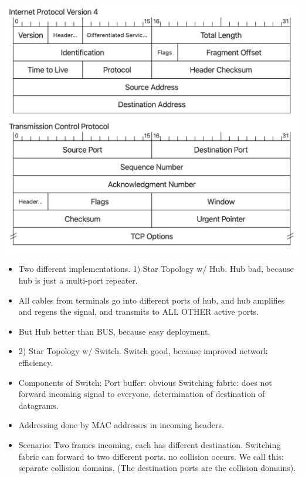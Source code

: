 \documentclass[10pt, landscape, oneside]{article}
\begin{document}
\begin{multicols}{6}
\includegraphics[width=\linewidth]{subfiles/Header_compact.png}


\begin{itemize}
    \item Two different implementations. 1) Star Topology w/ Hub. Hub bad, because hub is just a multi-port repeater.
    \item All cables from terminals go into different ports of hub, and hub amplifies and regens the signal, and transmits to ALL OTHER active ports.
    \item But Hub better than BUS, because easy deployment.

    \item 2) Star Topology w/ Switch. Switch good, because improved network efficiency.

\item Components of Switch: Port buffer: obvious Switching fabric: does not forward incoming signal to everyone, determination of destination of datagrams.

\item Addressing done by MAC addresses in incoming headers.

\item Scenario: Two frames incoming, each has different destination. Switching fabric can forward to two different ports. no collision occurs.
We call this: separate collision domains. (The destination ports are the collision domains).


\end{itemize}
\end{multicols}
\end{document}
